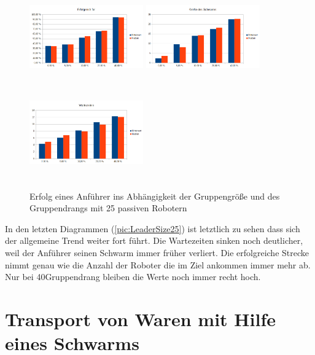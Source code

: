 \begin{figure}
	\includegraphics[width=4.9cm, height=4cm]{graphics/Statistics/Leader/FlockSize/25_1.png}
	\includegraphics[width=4.9cm, height=4cm]{graphics/Statistics/Leader/FlockSize/25_2.png}
	\includegraphics[width=4.9cm, height=4cm]{graphics/Statistics/Leader/FlockSize/25_3.png}
	\caption{Erfolg eines Anführer ins Abhängigkeit der Gruppengröße und des Gruppendrangs mit 25 passiven Robotern}
	\label{pic:LeaderSize25}
\end{figure}

In den letzten Diagrammen (\autoref{pic:LeaderSize25}) ist letztlich zu sehen dass sich der allgemeine Trend weiter fort führt. Die Wartezeiten sinken noch deutlicher, weil der Anführer seinen Schwarm immer früher verliert. Die erfolgreiche Strecke nimmt genau wie die Anzahl der Roboter die im Ziel ankommen immer mehr ab. Nur bei 40\per Gruppendrang bleiben die Werte noch immer recht hoch.











\section{Transport von Waren mit Hilfe eines Schwarms}

